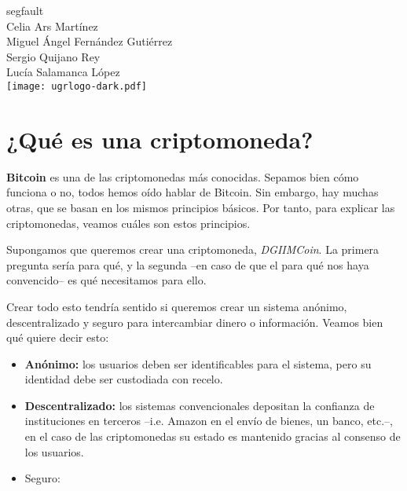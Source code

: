 \documentclass[10pt, a4paper]{article}
\theoremstyle{theorem-style}
\theoremstyle{theorem-style}
\theoremstyle{definition-style}
\theoremstyle{remark-style}
\theoremstyle{example-style}
\theoremstyle{definition-style}
\theoremstyle{remark-style}
\newcommand{\autor}{Celia Ars Martínez\\Miguel Ángel Fernández Gutiérrez\\Sergio Quijano Rey\\Lucía Salamanca López}
\newcommand{\grado}{segfault}
\begin{document}
\begin{titlepage}

  \parbox[t]{\textwidth}{
  	\raggedright %
  	\fontsize{40pt}{40pt}\selectfont\sffamily{}
  }

	\vfill
	
	\parbox[t]{\textwidth}{
		\raggedright %
		\sffamily\large
		\grado\\
		{\Large \autor }\\[15pt]
		\texttt{[image: ugrlogo-dark.pdf]}
	}

\end{titlepage}


\thispagestyle{empty}
\tableofcontents
\newpage


\part{¿Qué es una criptomoneda?}

\textbf{Bitcoin} es una de las criptomonedas más conocidas. Sepamos bien
cómo funciona o no, todos hemos oído hablar de Bitcoin. Sin embargo, hay
muchas otras, que se basan en los mismos principios básicos. Por tanto,
para explicar las criptomonedas, veamos cuáles son estos principios.

Supongamos que queremos crear una criptomoneda, \emph{DGIIMCoin}. La
primera pregunta sería para qué, y la segunda --en caso de que el para
qué nos haya convencido-- es qué necesitamos para ello.

Crear todo esto tendría sentido si queremos crear un sistema anónimo,
descentralizado y seguro para intercambiar dinero o información. Veamos
bien qué quiere decir esto:

\begin{itemize}
\itemsep1pt\parskip0pt
\item
  \textbf{Anónimo:} los usuarios deben ser identificables para el sistema, pero
  su identidad debe ser custodiada con recelo.
\item
  \textbf{Descentralizado:} los sistemas convencionales depositan la confianza de
  instituciones en terceros --i.e. Amazon en el envío de bienes, un banco, etc.--,
  en el caso de las criptomonedas su estado es mantenido gracias al consenso de
  los usuarios.
\item
  Seguro:
\end{itemize}
\end{document}

